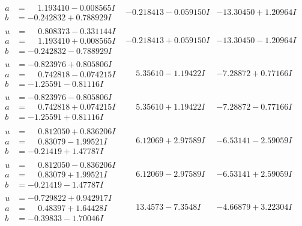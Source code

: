 \documentclass[1p]{elsarticle_modified}
\theoremstyle{definition}
\begin{document}
$$\begin{array}{c|c|c}
\begin{aligned}
a &= \phantom{-}1.193410 - 0.008565 I \\
b &= -0.242832 + 0.788929 I\end{aligned}
 & -0.218413 - 0.059150 I & -13.30450 + 1.20964 I \\ \hline\begin{aligned}
u &= \phantom{-}0.808373 - 0.331144 I \\
a &= \phantom{-}1.193410 + 0.008565 I \\
b &= -0.242832 - 0.788929 I\end{aligned}
 & -0.218413 + 0.059150 I & -13.30450 - 1.20964 I \\ \hline\begin{aligned}
u &= -0.823976 + 0.805806 I \\
a &= \phantom{-}0.742818 - 0.074215 I \\
b &= -1.25591 - 0.81116 I\end{aligned}
 & \phantom{-}5.35610 - 1.19422 I & -7.28872 + 0.77166 I \\ \hline\begin{aligned}
u &= -0.823976 - 0.805806 I \\
a &= \phantom{-}0.742818 + 0.074215 I \\
b &= -1.25591 + 0.81116 I\end{aligned}
 & \phantom{-}5.35610 + 1.19422 I & -7.28872 - 0.77166 I \\ \hline\begin{aligned}
u &= \phantom{-}0.812050 + 0.836206 I \\
a &= \phantom{-}0.83079 - 1.99521 I \\
b &= -0.21419 + 1.47787 I\end{aligned}
 & \phantom{-}6.12069 + 2.97589 I & -6.53141 - 2.59059 I \\ \hline\begin{aligned}
u &= \phantom{-}0.812050 - 0.836206 I \\
a &= \phantom{-}0.83079 + 1.99521 I \\
b &= -0.21419 - 1.47787 I\end{aligned}
 & \phantom{-}6.12069 - 2.97589 I & -6.53141 + 2.59059 I \\ \hline\begin{aligned}
u &= -0.729822 + 0.942917 I \\
a &= \phantom{-}0.48397 + 1.64428 I \\
b &= -0.39833 - 1.70046 I\end{aligned}
 & \phantom{-}13.4573 - 7.3548 I & -4.66879 + 3.22304 I \\ \hline\begin{aligned}

\end{aligned}
\end{array}$$
\end{document}
